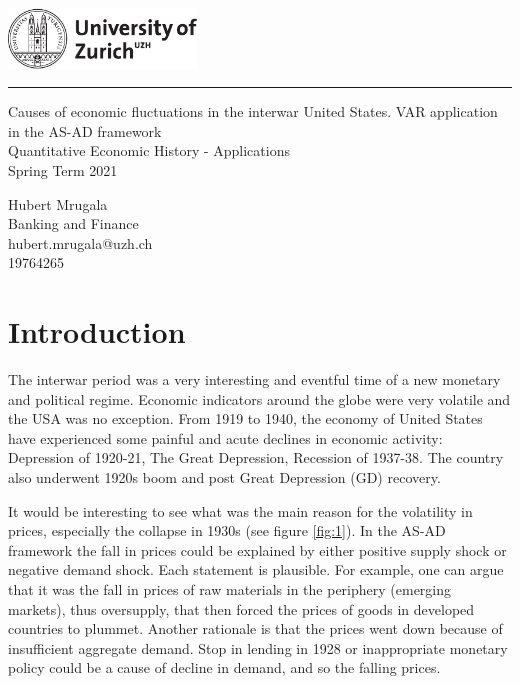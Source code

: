 \documentclass[a4paper,12pt]{article}
\begin{document}
\begin{titlepage}
\noindent\includegraphics[width=5cm]{uzh_logo_e_pos.pdf}
\noindent\rule{\textwidth}{0.4pt}
\vspace{1cm}
  \begin{center}
		  {\LARGE Causes of economic fluctuations in the interwar United States. VAR application in the AS-AD framework  \\}
		{\Large Quantitative Economic History - Applications\\Spring Term 2021}
  \end{center}
\vfill

{\flushleft
Hubert Mrugala \\
Banking and Finance\\
hubert.mrugala@uzh.ch\\
19764265}  

\end{titlepage}

\pagebreak
\pagebreak

\section{Introduction}

The interwar period was a very interesting and eventful time of a new monetary and political regime. Economic indicators around the globe were very volatile and the USA was no exception. From 1919 to 1940, the economy of United States have experienced some painful and acute declines in economic activity: Depression of 1920-21, The Great Depression, Recession of 1937-38. The country also underwent 1920s boom and post Great Depression (GD) recovery.

It would be interesting to see what was the main reason for the volatility in prices, especially the collapse in 1930s (see figure \ref{fig:1}). In the AS-AD framework the fall in prices could be explained by either positive supply shock or negative demand shock. Each statement is plausible. For example, one can argue that it was the fall in prices of raw materials in the periphery (emerging markets), thus oversupply, that then forced the prices of goods in developed countries to plummet. Another rationale is that the prices went down because of insufficient aggregate demand. Stop in lending in 1928 \citep{kindleberger1973} or inappropriate monetary policy \citep{friedman1963} could be a cause of decline in demand, and so the falling prices.
\end{document}
